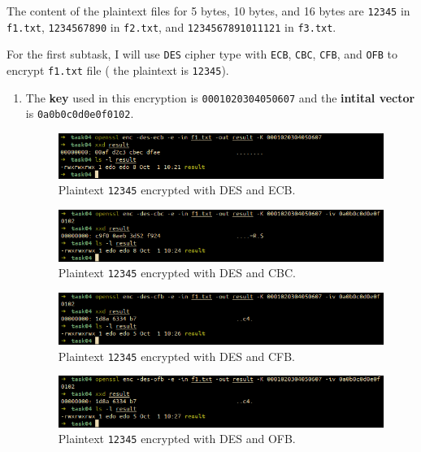 \documentclass{article}
\begin{document}
The content of the plaintext files for 5 bytes, 10 bytes, and 16 bytes are
\texttt{12345} in \texttt{f1.txt}, \texttt{1234567890} in \texttt{f2.txt}, and
\texttt{1234567891011121} in \texttt{f3.txt}.

For the first subtask, I will use \texttt{DES} cipher type with \texttt{ECB},
\texttt{CBC}, \texttt{CFB}, and \texttt{OFB} to encrypt \texttt{f1.txt} file (
the plaintext is \texttt{12345}).

\begin{enumerate}
    \item The \textbf{key} used in this encryption is \texttt{0001020304050607}
        and the \textbf{intital vector} is \texttt{0a0b0c0d0e0f0102}.

        \begin{figure}[!ht]
            \centering
            \includegraphics[scale=0.68]{task04_1_ecb.png}
            \caption{Plaintext \texttt{12345} encrypted with DES and ECB.}
        \end{figure}

        \begin{figure}[!ht]
            \centering
            \includegraphics[scale=0.68]{task04_1_cbc.png}
            \caption{Plaintext \texttt{12345} encrypted with DES and CBC.}
        \end{figure}

        \begin{figure}[!ht]
            \centering
            \includegraphics[scale=0.68]{task04_1_cfb.png}
            \caption{Plaintext \texttt{12345} encrypted with DES and CFB.}
        \end{figure}

        \begin{figure}[!ht]
            \centering
            \includegraphics[scale=0.68]{task04_1_ofb.png}
            \caption{Plaintext \texttt{12345} encrypted with DES and OFB.}
        \end{figure}


\end{enumerate}
\end{document}
